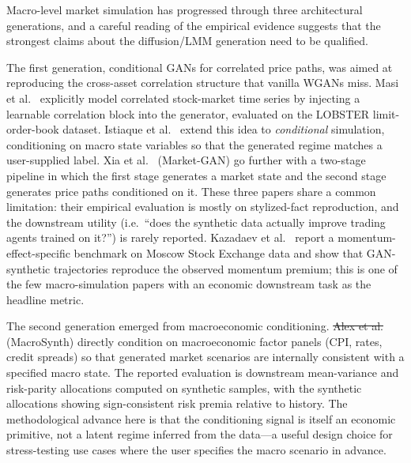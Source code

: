 \documentclass[11pt,a4paper]{article}
\makeatletter
\providecommand{\DIFaddtex}[1]{{\protect\color{blue}\uwave{#1}}} %
\providecommand{\DIFdeltex}[1]{{\protect\color{red}\sout{#1}}} %
\providecommand{\DIFaddbegin}{} %
\providecommand{\DIFaddend}{} %
\providecommand{\DIFdelbegin}{} %
\providecommand{\DIFdelend}{} %
\providecommand{\DIFadd}[1]{\texorpdfstring{\DIFaddtex{#1}}{#1}} %
\providecommand{\DIFdel}[1]{\texorpdfstring{\DIFdeltex{#1}}{}} %
\providecommand{\DIFscaledelfig}{0.5}
\newlength{\DIFdelgraphicswidth} %
\newlength{\DIFdelgraphicsheight} %
\providecommand{\DIFaddincludegraphics}[2][]{{\color{blue}\fbox{\DIFOincludegraphics[#1]{#2}}}} %
\providecommand{\DIFdelincludegraphics}[2][]{%
\sbox{\DIFdelgraphicsbox}{\DIFOincludegraphics[#1]{#2}}%
\settoboxwidth{\DIFdelgraphicswidth}{\DIFdelgraphicsbox} %
\settoboxtotalheight{\DIFdelgraphicsheight}{\DIFdelgraphicsbox} %
\scalebox{\DIFscaledelfig}{%
\parbox[b]{\DIFdelgraphicswidth}{\usebox{\DIFdelgraphicsbox}\\[-\baselineskip] \rule{\DIFdelgraphicswidth}{0em}}\llap{\resizebox{\DIFdelgraphicswidth}{\DIFdelgraphicsheight}{%
\setlength{\unitlength}{\DIFdelgraphicswidth}%
\begin{picture}(1,1)%
\thicklines\linethickness{2pt} %
{\color[rgb]{1,0,0}\put(0,0){\framebox(1,1){}}}%
{\color[rgb]{1,0,0}\put(0,0){\line( 1,1){1}}}%
{\color[rgb]{1,0,0}\put(0,1){\line(1,-1){1}}}%
\end{picture}%
}\hspace*{3pt}}} %
} %
\DeclareRobustCommand{\DIFaddbegin}{\DIFOaddbegin \let\includegraphics\DIFaddincludegraphics} %
\DeclareRobustCommand{\DIFaddend}{\DIFOaddend \let\includegraphics\DIFOincludegraphics} %
\DeclareRobustCommand{\DIFdelbegin}{\DIFOdelbegin \let\includegraphics\DIFdelincludegraphics} %
\DeclareRobustCommand{\DIFdelend}{\DIFOaddend \let\includegraphics\DIFOincludegraphics} %
\let\sout@orig\sout %
\renewcommand{\sout}[1]{\ifmmode\text{\sout@orig{\ensuremath{#1}}}\else\sout@orig{#1}\fi} %
\makeatother
\begin{document}
Macro-level market simulation has progressed through three architectural generations, and a careful reading of the empirical evidence suggests that the strongest claims about the diffusion/LMM generation need to be qualified.

The first generation, conditional GANs for correlated price paths, was aimed at reproducing the cross-asset correlation structure that vanilla WGANs miss. Masi et al.~\citep{CoMeTS-GAN} explicitly model correlated stock-market time series by injecting a learnable correlation block into the generator, evaluated on the LOBSTER limit-order-book dataset. Istiaque et al.~\citep{istiaque2024cts} extend this idea to \emph{conditional} simulation, conditioning on macro state variables so that the generated regime matches a user-supplied label. Xia et al.~\citep{xia2024market} (Market-GAN) go further with a two-stage pipeline in which the first stage generates a market state and the second stage generates price paths conditioned on it. These three papers share a common limitation: their empirical evaluation is mostly on stylized-fact reproduction, and the downstream utility (i.e.\ ``does the synthetic data actually improve trading agents trained on it?'') is rarely reported. Kazadaev et al.~\citep{GAN-MoEx} report a momentum-effect-specific benchmark on Moscow Stock Exchange data and show that GAN-synthetic trajectories reproduce the observed momentum premium; this is one of the few macro-simulation papers with an economic downstream task as the headline metric.

The second generation emerged from macroeconomic conditioning. \DIFdelbegin \DIFdel{Alex et al.}\DIFdelend \DIFaddbegin \DIFadd{Rusnak and Daul}\DIFaddend ~\citep{alex2024macroeconomic} (MacroSynth) directly condition on macroeconomic factor panels (CPI, rates, credit spreads) so that generated market scenarios are internally consistent with a specified macro state. The reported evaluation is downstream mean-variance and risk-parity allocations computed on synthetic samples, with the synthetic allocations showing sign-consistent risk premia relative to history. The methodological advance here is that the conditioning signal is itself an economic primitive, not a latent regime inferred from the data---a useful design choice for stress-testing use cases where the user specifies the macro scenario in advance.
\end{document}
